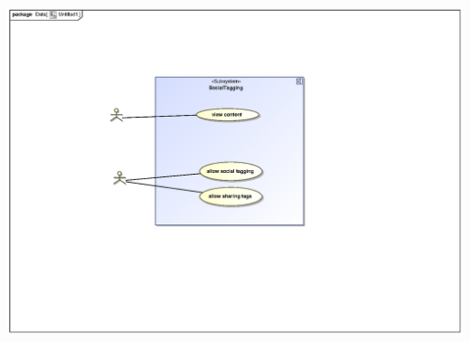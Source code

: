 \documentclass{scrreprt}
\begin{document}
\includegraphics[scale=.9]{Semaka_Use_Case.eps}\\
\end{document}
